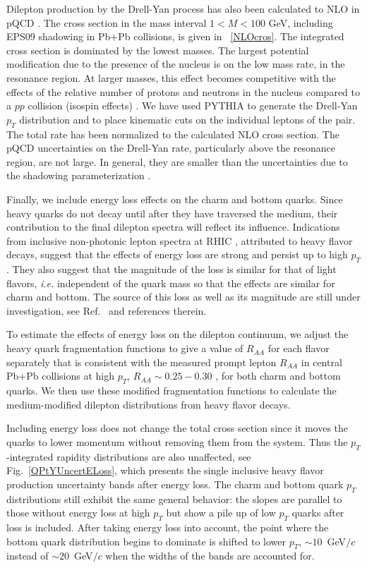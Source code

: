 Dilepton production by the Drell-Yan process has also been calculated
to NLO in pQCD \cite{vanNeerven}.  The cross section in the mass interval
$1 < M < 100$ GeV, including EPS09 shadowing in Pb+Pb collisions, is given
in \Table~\ref{NLOcros}.  The integrated cross section is dominated by the lowest
masses.  The largest potential modification due to the presence
of the nucleus is on the low mass rate, in the resonance region.  At larger 
masses, this effect becomes competitive with the effects of the relative number
of protons and neutrons in the nucleus compared to a $pp$ collision (isospin
effects) \cite{HPpA}.  We have used PYTHIA \cite{PYTHIA} to generate the 
Drell-Yan $p_T$ distribution and to place kinematic cuts on the individual 
leptons of the pair.  The total rate has been normalized to the calculated
NLO cross 
section.  The pQCD uncertainties on the Drell-Yan rate, particularly above the
resonance region, are not large.  In general, they are smaller than the
uncertainties due to the shadowing parameterization \cite{HPpA}.

Finally, we include energy loss effects on the charm and bottom quarks. 
Since heavy quarks do not decay until after they have traversed the
medium, their contribution to the final dilepton spectra will reflect its 
influence.  Indications from inclusive non-photonic lepton spectra at RHIC
\cite{RAARHIC}, attributed to heavy flavor decays, suggest that the effects of
energy loss are strong and persist up to high $p_T$.  They also suggest that
the magnitude of the loss is similar for that of light flavors, {\it i.e.}
independent of the quark mass so that the effects are similar for charm and
bottom.  The source of this loss as well as its magnitude are still under 
investigation, see Ref.~\cite{FUV} and references therein.

To estimate the effects of energy loss on the dilepton continuum, we adjust the
heavy quark fragmentation functions to give a value of $R_{AA}$ for each flavor
separately that is consistent with the measured prompt lepton $R_{AA}$
in central Pb+Pb collisions at high $p_T$, $R_{AA} \sim
0.25 - 0.30$ \cite{RAAAlice}, for both charm and bottom quarks.  We then use
these modified fragmentation functions to calculate the 
medium-modified dilepton distributions from heavy flavor decays.

Including energy loss does not change the total cross section since it moves
the quarks to lower momentum without removing them from the system.  Thus the
$p_T$-integrated rapidity distributions are also unaffected, see 
Fig.~\ref{QPtYUncertELoss}, which presents the single inclusive heavy flavor 
production uncertainty bands after energy loss.  
The charm and bottom quark $p_T$ distributions still
exhibit the same general behavior: the slopes are parallel to those without 
energy loss at high $p_T$ but show a pile up of low $p_T$ quarks after loss
is included.  After taking energy loss into account, the point where the bottom 
quark distribution begins to dominate is shifted to lower $p_T$, 
$\sim 10$~GeV$/c$ instead of $\sim 20$~GeV$/c$ 
when the widths of the bands are accounted for.
  
